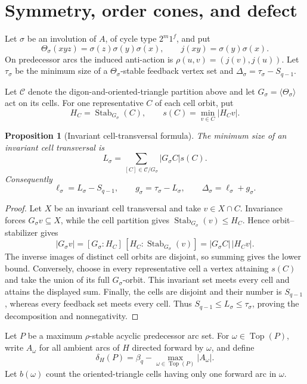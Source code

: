 \documentclass[11pt,a4paper]{article}
\newtheorem{proposition}[theorem]{Proposition}
\theoremstyle{remark}
\newcommand{\Top}{\operatorname{Top}}
\begin{document}
\section{Symmetry, order cones, and defect}
\label{sec:setup}

Let \(\sigma\) be an involution of \(A\), of cycle type \(2^m1^f\), and put
\[
 \Theta_\sigma(xyz)=\sigma(z)\sigma(y)\sigma(x),
 \qquad j(xy)=\sigma(y)\sigma(x).
\]
On predecessor arcs the induced anti-action is
\(\rho(u,v)=(j(v),j(u))\).  Let \(\tau_\sigma\) be the minimum size of a
\(\Theta_\sigma\)-stable feedback vertex set and
\(\Delta_\sigma=\tau_\sigma-S_{q-1}\).

Let \(\mathcal C\) denote the digon-and-oriented-triangle partition above and
let \(G_\sigma=\langle\Theta_\sigma\rangle\) act on its cells.  For one
representative \(C\) of each cell orbit, put
\[
 H_C=\operatorname{Stab}_{G_\sigma}(C),
 \qquad s(C)=\min_{v\in C}|H_Cv|.
\]

\begin{proposition}[Invariant cell-transversal formula]
\label{prop:cell-orbit}
The minimum size of an invariant cell transversal is
\[
 L_\sigma=\sum_{[C]\in\mathcal C/G_\sigma}|G_\sigma C|s(C).
\]
Consequently
\[
 \ell_\sigma=L_\sigma-S_{q-1},\qquad
 g_\sigma=\tau_\sigma-L_\sigma,\qquad
 \Delta_\sigma=\ell_\sigma+g_\sigma.
\]
\end{proposition}

\begin{proof}
Let \(X\) be an invariant cell transversal and take \(v\in X\cap C\).
Invariance forces \(G_\sigma v\subseteq X\), while the cell partition gives
\(\operatorname{Stab}_{G_\sigma}(v)\leq H_C\).  Hence orbit--stabilizer gives
\[
 |G_\sigma v|
 =[G_\sigma:H_C]\,[H_C:\operatorname{Stab}_{G_\sigma}(v)]
 =|G_\sigma C|\,|H_Cv|.
\]
The inverse images of distinct cell orbits are disjoint, so summing gives the
lower bound.  Conversely, choose in every representative cell a vertex
attaining \(s(C)\) and take the union of its full \(G_\sigma\)-orbit.  This
invariant set meets every cell and attains the displayed sum.  Finally, the
cells are disjoint and their number is \(S_{q-1}\), whereas every feedback
set meets every cell.  Thus \(S_{q-1}\leq L_\sigma\leq\tau_\sigma\), proving
the decomposition and nonnegativity.
\end{proof}

Let \(P\) be a maximum \(\rho\)-stable acyclic predecessor arc set.  For
\(\omega\in\Top(P)\), write \(A_\omega\) for all ambient arcs of \(H\)
directed forward by \(\omega\), and define
\[
 \delta_H(P)=\beta_q-
 \max_{\omega\in\Top(P)}|A_\omega|.                 \tag{3.1}
\]
Let \(b(\omega)\) count the oriented-triangle cells having only one forward
arc in \(\omega\).
\end{document}
